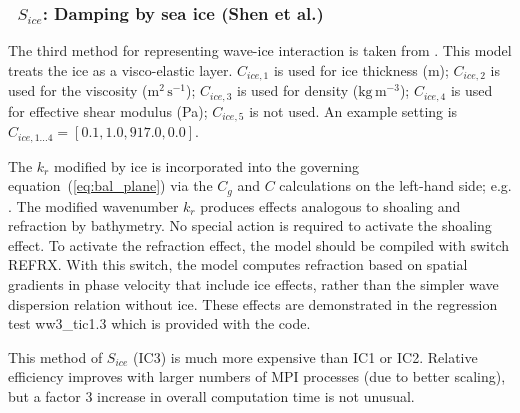 \vsssub
\subsubsection{~$S_{ice}$: Damping by sea ice (Shen et al.)} \label{sec:ICE3}
\vsssub


\noindent
The third method for representing wave-ice interaction is taken from\linebreak
\cite{art:WS10}. This model treats the ice as a visco-elastic
layer. ${C_{ice,1}}$ is used for ice thickness (m); ${C_{ice,2}}$ is used for
the viscosity ($\mathrm{m^2\,s^{-1}}$); ${C_{ice,3}}$ is used for density
($\mathrm{kg\,m^{-3}}$); ${C_{ice,4}}$ is used for effective shear modulus
(Pa); ${C_{ice,5}}$ is not used. An example setting is 
${C_{ice,1...4}}=[0.1, 1.0, 917.0, 0.0]$.

The ${k_r}$ modified by ice is incorporated into the governing
equation~(\ref{eq:bal_plane}) via the $C_g$ and $C$ calculations on the
left-hand side; e.g. \citet[][and subsequent unpublished work]{art:RH09}.  The
modified wavenumber ${k_r}$ produces effects analogous to shoaling and
refraction by bathymetry. No special action is required to activate the
shoaling effect. To activate the refraction effect, the model should be
compiled with switch {\code REFRX}. With this switch, the model computes
refraction based on spatial gradients in phase velocity that include ice effects, rather than the
simpler wave dispersion relation without ice. These effects are demonstrated in the regression test {\file
ww3\_tic1.3} which is provided with the code.

This method of $S_{ice}$ ({\code IC3}) is much more expensive than
 {\code IC1} or {\code IC2}.  Relative efficiency improves with larger 
numbers of MPI processes (due to  better scaling), but a factor 3 increase 
in overall computation time is not unusual. 
